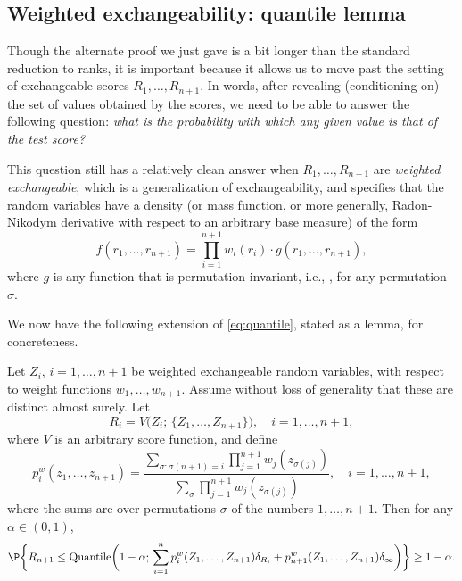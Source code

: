\documentclass{article}
\begin{document}
\subsection{Weighted exchangeability: quantile lemma}

Though the alternate proof we just gave is a bit longer than the standard
reduction to ranks, it is important because it allows us to move past the
setting of exchangeable scores $R_1,\dots,R_{n+1}$. In words, after revealing
(conditioning on) the set of values obtained by the scores, we need to be able
to answer the following question: \emph{what is the probability with which any
  given value is that of the test score?}   

This question still has a relatively clean answer when $R_1,\dots,R_{n+1}$ are
\emph{weighted exchangeable}, which is a generalization of exchangeability, and
specifies that the random variables have a density (or mass function, or more
generally, Radon-Nikodym derivative with respect to an arbitrary base measure)
of the form   
\begin{equation}
\label{eq:weighted_exch}
f(r_1,\dots,r_{n+1}) = \prod_{i=1}^{n+1} w_i(r_i) \cdot g(r_1,\dots,r_{n+1}),  
\end{equation}
where $g$ is any function that is permutation invariant, i.e.,
, for
any permutation $\sigma$.

We now have the following extension of \eqref{eq:quantile}, stated as a lemma,
for concreteness.  

\begin{lemma}
\label{lem:weighted_quant}
Let $Z_i$, $i=1,\dots,n+1$ be weighted exchangeable random variables, with
respect to weight functions $w_1,\dots,w_{n+1}$. Assume without loss of
generality that these are distinct almost surely. Let 
\[
R_i = V\big( Z_i; \, \{Z_1,\dots,Z_{n+1}\} \big), \quad i=1,\dots,n+1, 
\]
where $V$ is an arbitrary score function, and define
\begin{equation}
\label{eq:weighted_prob}
p^w_i(z_1,\dots,z_{n+1}) = 
\frac{\sum_{\sigma : \sigma(n+1)=i} \prod_{j=1}^{n+1} w_j(z_{\sigma(j)})}
{\sum_\sigma \prod_{j=1}^{n+1} w_j(z_{\sigma(j)})}, \quad i=1,\dots,n+1,   
\end{equation} 
where the sums are over permutations $\sigma$ of the numbers $1,\dots,n+1$.
Then for any $\alpha \in (0,1)$,  
\begin{equation}
\label{eq:weighted_quant}
\P\bigg\{ R_{n+1} \leq \Quantile\bigg( 1-\alpha; \, \sum_{i=1}^n 
p^w_i(Z_1,\dots,Z_{n+1}) \delta_{R_i} + p^w_{n+1}(Z_1,\dots,Z_{n+1}) 
\delta_\infty \bigg) \bigg\} \geq 1-\alpha.
\end{equation}
\end{lemma}
\end{document}
